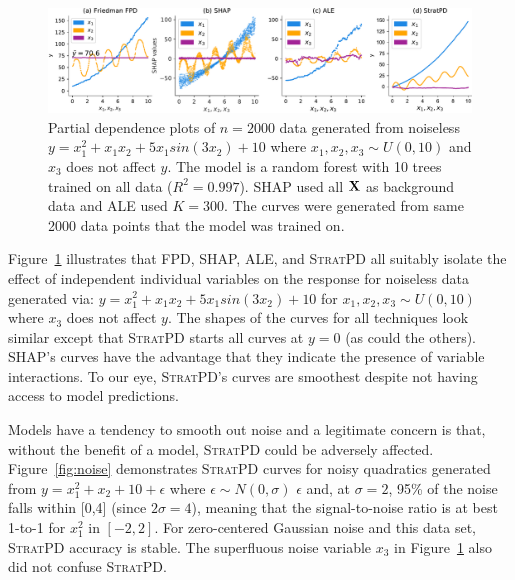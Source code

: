\documentclass[]{article} %
\newcommand{\figref}[1]{Figure~\ref{#1}}
\newcommand{\spd}{\fontfamily{cmr}\textsc{\small StratPD}}
\begin{document}
\begin{figure}[!htbp]
\begin{center}
\includegraphics[scale=0.45]{images/interactions.pdf}\vspace{-2mm}
\caption{\small  Partial dependence plots of $n=2000$ data generated from noiseless $y = x_1^2 + x_1 x_2 + 5 x_1 sin(3 x_2) + 10$ where $x_1,x_2,x_3 \sim U(0,10)$ and $x_3$ does not affect $y$. The model is a random forest with 10 trees trained on all data ($R^2=0.997$). SHAP used all $\bf X$ as background data and ALE used $K=300$. The curves were generated from same 2000 data points that the model was trained on.}
\label{fig:interactions}
\end{center}
\end{figure}

\figref{fig:interactions} illustrates that FPD, SHAP, ALE, and \spd{} all suitably isolate the effect of independent individual variables on the response for noiseless data generated via: $y = x_1^2 + x_1 x_2 + 5 x_1 sin(3 x_2) + 10$ for $x_1,x_2,x_3 \sim U(0,10)$ where $x_3$ does not affect $y$. The shapes of the curves for all techniques look similar except that \spd{} starts all curves at $y=0$ (as could the others). SHAP's curves have the advantage that they indicate the presence of variable interactions. To our eye, \spd's curves are smoothest despite not having access to model predictions.



Models have a tendency to smooth out noise and a legitimate concern is that, without the benefit of a model, \spd{} could be adversely affected. \figref{fig:noise} demonstrates \spd{} curves for noisy quadratics generated from $y = x_1^2 + x_2 + 10 + \epsilon$ where $\epsilon \sim N(0,\sigma)$ $\epsilon$ and, at $\sigma=2$, 95\% of the noise falls within [0,4] (since $2\sigma = 4$), meaning that the signal-to-noise ratio is at best 1-to-1 for $x_1^2$ in $[-2,2]$. For zero-centered Gaussian noise and this data set, \spd{} accuracy is stable.  The superfluous noise variable $x_3$ in \figref{fig:interactions} also did not confuse \spd.
\end{document}

